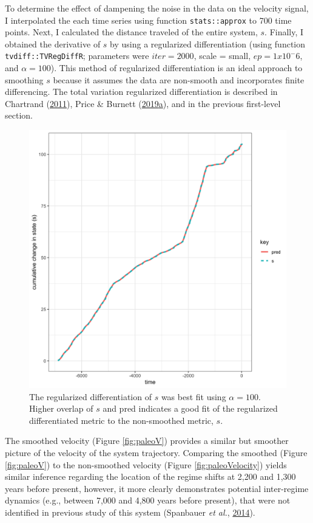 \documentclass[print]{nuthesis}
\begin{document}
To determine the effect of dampening the noise in the data on the velocity signal, I interpolated the each time series using function \texttt{stats::approx} to 700 time points. Next, I calculated the distance traveled of the entire system, \(s\). Finally, I obtained the derivative of \(s\) by using a regularized differentiation (using function \texttt{tvdiff::TVRegDiffR}; parameters were \(iter = 2000\), scale = small, \(ep = 1 x 10^-6\), and \(\alpha = 100\)). This method of regularized differentiation is an ideal approach to smoothing \(s\) because it assumes the data are non-smooth and incorporates finite differencing. The total variation regularized differentiation is described in Chartrand (\protect\hyperlink{ref-chartrand2011numerical}{2011}), Price \& Burnett (\protect\hyperlink{ref-price2019tvdiff}{2019}\protect\hyperlink{ref-price2019tvdiff}{a}), and in the previous first-level section.
\begin{figure}
\includegraphics[width=0.85\linewidth]{./chapterFiles/velocity/figsCalledInDiss/paleoObsPred} \caption{The regularized differentiation of $s$ was best fit using $\alpha = 100$. Higher overlap of $s$ and pred indicates a good fit of the regularized differentiated metric to the non-smoothed metric, $s$.}\label{fig:paleoObsPred}
\end{figure}
The smoothed velocity (Figure \ref{fig:paleoV}) provides a similar but smoother picture of the velocity of the system trajectory. Comparing the smoothed (Figure \ref{fig:paleoV}) to the non-smoothed velocity (Figure \ref{fig:paleoVelocity}) yields similar inference regarding the location of the regime shifts at 2,200 and 1,300 years before present, however, it more clearly demonstrates potential inter-regime dynamics (e.g., between 7,000 and 4,800 years before present), that were not identified in previous study of this system (Spanbauer \emph{et al.}, \protect\hyperlink{ref-spanbauer_prolonged_2014}{2014}).
\end{document}
